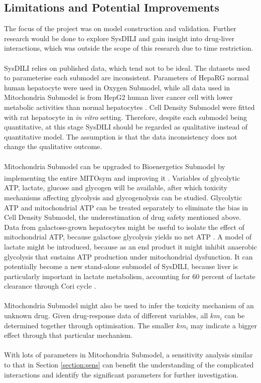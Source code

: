\documentclass[12pt]{article}
\begin{document}
\subsection{Limitations and Potential Improvements}
The focus of the project was on model construction and validation. Further research would be done to explore SysDILI and gain insight into drug-liver interactions, which was outside the scope of this research due to time restriction.\\\\
SysDILI relies on published data, which tend not to be ideal. The datasets used to parameterise each submodel are inconsistent. Parameters of HepaRG normal human hepatocyte were used in Oxygen Submodel, while all data used in Mitochondria Submodel is from HepG2 human liver cancer cell with lower metabolic activities than normal hepatocytes \cite{vinkenProtocolsVitroHepatocyte2015}. Cell Density Submodel were fitted with rat hepatocyte in \textit{in vitro} setting. Therefore, despite each submodel being quantitative, at this stage SysDILI should be regarded as qualitative instead of quantitative model. The assumption is that the data inconsistency does not change the qualitative outcome.\\\\
Mitochondria Submodel can be upgraded to Bioenergetics Submodel by implementing the entire MITOsym and improving it \textsuperscript{\textregistered}. Variables of glycolytic ATP, lactate, glucose and glycogen will be available, after which toxicity mechanisms affecting glycolysis and glycogenolysis can be studied. Glycolytic ATP and mitochondrial ATP can be treated separately to eliminate the bias in Cell Density Submodel, the underestimation of drug safety mentioned above. Data from galactose-grown hepatocytes might be useful to isolate the effect of mitochondrial ATP, because galactose glycolysis yields no net ATP \cite{dykensMitochondrialToxicity2014b,shiratoriGlycolyticSuppressionDramatically2019}. A model of lactate might be introduced, because as an end product it might inhibit anaerobic glycolysis that sustains ATP production under mitochondrial dysfunction. It can potentially become a new stand-alone submodel of SysDILI, because liver is particularly important in lactate metabolism, accounting for 60 percent of lactate clearance through Cori cycle \cite{levyLactateShockState2006,harrisEnergyMetabolismGluconeogenesis2021} .\\\\
Mitochondria Submodel might also be used to infer the toxicity mechanism of an unknown drug. Given drug-response data of different variables, all {$km_i$} can be determined together through optimisation. The smaller $km_i$ may indicate a bigger effect through that particular mechanism.\\\\With lots of parameters in Mitochondria Submodel, a sensitivity analysis similar to that in Section \ref{section:sens} can benefit the understanding of the complicated interactions and identify the significant parameters for further investigation.\\\\
\end{document}

